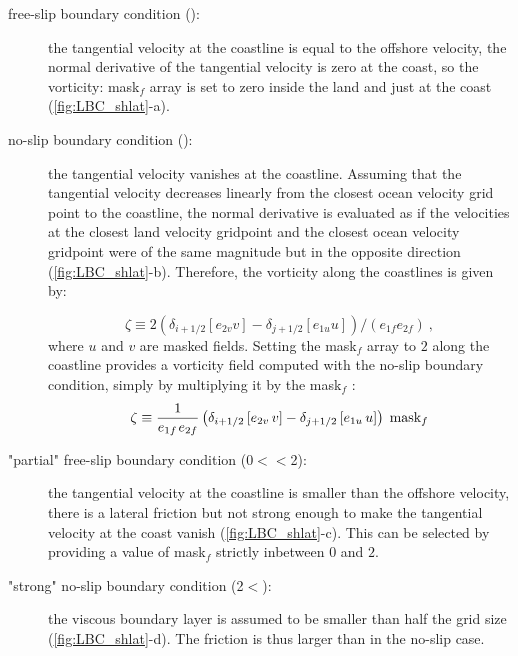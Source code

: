 \documentclass[../main/NEMO_manual]{subfiles}
\begin{document}
\begin{description}

\item[free-slip boundary condition ():] the tangential velocity at
  the coastline is equal to the offshore velocity,
  \ie the normal derivative of the tangential velocity is zero at the coast,
  so the vorticity: mask$_{f}$ array is set to zero inside the land and just at the coast
  (\autoref{fig:LBC_shlat}-a).

\item[no-slip boundary condition ():] the tangential velocity vanishes at the coastline.
  Assuming that the tangential velocity decreases linearly from
  the closest ocean velocity grid point to the coastline,
  the normal derivative is evaluated as if the velocities at the closest land velocity gridpoint and
  the closest ocean velocity gridpoint were of the same magnitude but in the opposite direction
  (\autoref{fig:LBC_shlat}-b).
  Therefore, the vorticity along the coastlines is given by: 

  \[
    \zeta \equiv 2 \left(\delta_{i+1/2} \left[e_{2v} v \right] - \delta_{j+1/2} \left[e_{1u} u \right] \right) / \left(e_{1f} e_{2f} \right) \ ,
  \]
  where $u$ and $v$ are masked fields.
  Setting the mask$_{f}$ array to $2$ along the coastline provides a vorticity field computed with
  the no-slip boundary condition, simply by multiplying it by the mask$_{f}$ :
  \[
    \zeta \equiv \frac{1}{e_{1f} {\kern 1pt}e_{2f} }\left( {\delta_{i+1/2}
        \left[ {e_{2v} \,v} \right]-\delta_{j+1/2} \left[ {e_{1u} \,u} \right]}
    \right)\;\mbox{mask}_f
  \]

\item["partial" free-slip boundary condition (0$<$$<$2):] the tangential velocity at
  the coastline is smaller than the offshore velocity, \ie there is a lateral friction but
  not strong enough to make the tangential velocity at the coast vanish (\autoref{fig:LBC_shlat}-c).
  This can be selected by providing a value of mask$_{f}$ strictly inbetween $0$ and $2$.

\item["strong" no-slip boundary condition (2$<$):] the viscous boundary layer is assumed to
  be smaller than half the grid size (\autoref{fig:LBC_shlat}-d).
  The friction is thus larger than in the no-slip case.

\end{description}
\end{document}
